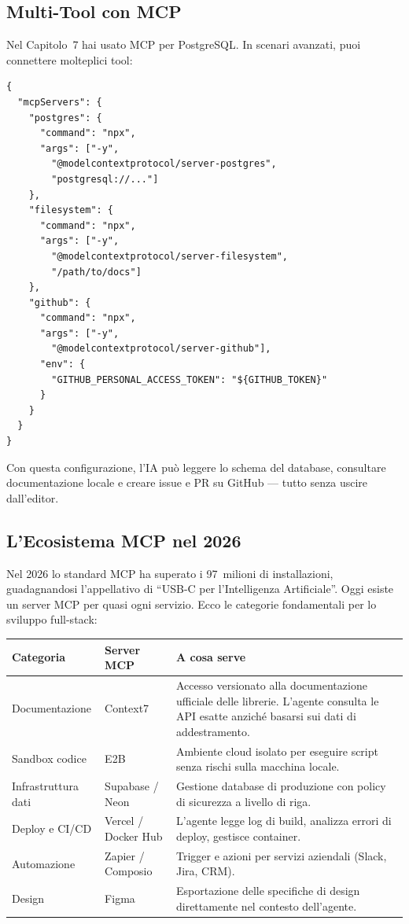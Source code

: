 \subsection{Multi-Tool con MCP}

Nel Capitolo~7 hai usato MCP per PostgreSQL. In scenari avanzati, puoi connettere molteplici tool:

\begin{lstlisting}[language={},title={Configurazione MCP multi-tool}]
{
  "mcpServers": {
    "postgres": {
      "command": "npx",
      "args": ["-y",
        "@modelcontextprotocol/server-postgres",
        "postgresql://..."]
    },
    "filesystem": {
      "command": "npx",
      "args": ["-y",
        "@modelcontextprotocol/server-filesystem",
        "/path/to/docs"]
    },
    "github": {
      "command": "npx",
      "args": ["-y",
        "@modelcontextprotocol/server-github"],
      "env": {
        "GITHUB_PERSONAL_ACCESS_TOKEN": "${GITHUB_TOKEN}"
      }
    }
  }
}
\end{lstlisting}

Con questa configurazione, l'IA può leggere lo schema del database, consultare documentazione locale e creare issue e PR su GitHub --- tutto senza uscire dall'editor.

\subsection{L'Ecosistema MCP nel 2026}

Nel 2026 lo standard MCP ha superato i 97~milioni di installazioni, guadagnandosi l'appellativo di ``USB-C per l'Intelligenza Artificiale''. Oggi esiste un server MCP per quasi ogni servizio. Ecco le categorie fondamentali per lo sviluppo full-stack:

\begin{center}
\begin{small}
\begin{tabularx}{\textwidth}{l l X}
\toprule
\textbf{Categoria} & \textbf{Server MCP} & \textbf{A cosa serve} \\
\midrule
Documentazione & Context7 & Accesso versionato alla documentazione ufficiale delle librerie. L'agente consulta le API esatte anziché basarsi sui dati di addestramento. \\
Sandbox codice & E2B & Ambiente cloud isolato per eseguire script senza rischi sulla macchina locale. \\
Infrastruttura dati & Supabase / Neon & Gestione database di produzione con policy di sicurezza a livello di riga. \\
Deploy e CI/CD & Vercel / Docker Hub & L'agente legge log di build, analizza errori di deploy, gestisce container. \\
Automazione & Zapier / Composio & Trigger e azioni per servizi aziendali (Slack, Jira, CRM). \\
Design & Figma & Esportazione delle specifiche di design direttamente nel contesto dell'agente. \\
\bottomrule
\end{tabularx}
\end{small}
\end{center}

